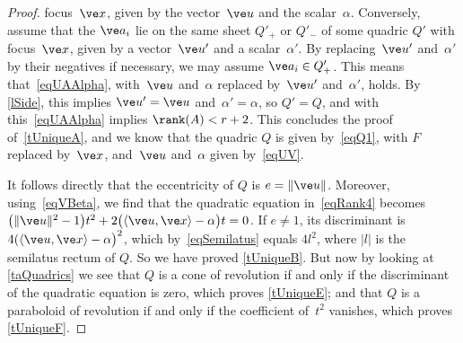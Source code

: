\documentclass[reqno]{amsart}
\begin{document}
\begin{proof}
  focus~$\ve x$, given by the vector~$\ve u$ and the
  scalar~$\alpha$. Conversely, assume that the $\ve a_i$ lie on the
  same sheet $Q'_+$ or $Q'_-$ of some quadric $Q'$ with focus~$\ve x$,
  given by a vector~$\ve u'$ and a scalar~$\alpha'$. By
  replacing~$\ve u'$ and~$\alpha'$ by their negatives if necessary, we
  may assume $\ve a_i \in Q'_+$. This means that~\eqref{eqUAAlpha},
  with~$\ve u$ and~$\alpha$ replaced by~$\ve u'$ and~$\alpha'$,
  holds. By \cref{lSide}, this implies $\ve u' = \ve u$
  and~$\alpha' = \alpha$, so $Q' = Q$, and with this~\eqref{eqUAAlpha}
  implies $\rank(A) < r + 2$. This concludes the proof
  of~\ref{tUniqueA}, and we know that the quadric $Q$ is given
  by~\eqref{eqQ1}, with $F$ replaced by~$\ve x$, and~$\ve u$
  and~$\alpha$ given by~\eqref{eqUV}.

  It follows directly that the eccentricity of $Q$ is
  $e = \lVert\ve u\rVert$. Moreover, using~\eqref{eqVBeta}, we find
  that the quadratic equation in~\eqref{eqRank4} becomes
  $\bigl(\lVert\ve u\rVert^2 -1\bigr) t^2 + 2\bigl(\langle\ve u,\ve
  x\rangle - \alpha\bigr) t = 0$. If $e \ne 1$, its discriminant is
  $4 (\langle\ve u,\ve x\rangle - \alpha\bigr)^2$, which
  by~\eqref{eqSemilatus} equals $4 l^2$, where $|l|$ is the semilatus
  rectum of $Q$. So we have proved \cref{tUniqueB}. But now by looking
  at \cref{taQuadrics} we see that $Q$ is a cone of revolution if and
  only if the discriminant of the quadratic equation is zero, which
  proves \cref{tUniqueE}; and that $Q$ is a paraboloid of revolution
  if and only if the coefficient of~$t^2$ vanishes, which proves
  \cref{tUniqueF}.


\end{proof}
\end{document}
